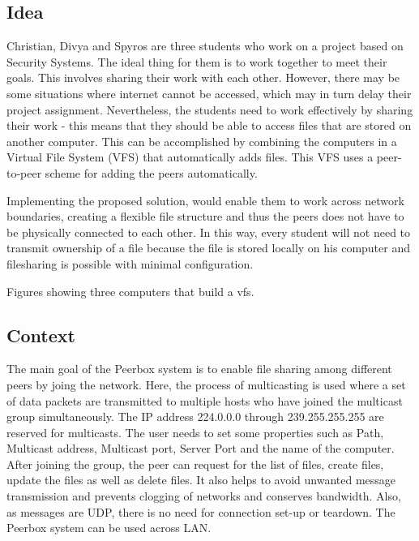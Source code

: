 
\subsection{Idea}

Christian, Divya and Spyros are three students who work on a project based on Security Systems. The ideal thing for them is to work together to meet their goals. This involves sharing their work with each other. However, there may be some situations where internet cannot be accessed, which may in turn delay their project assignment. Nevertheless, the students need to work effectively by sharing their work - this means that they should be able to access files that are stored on another computer. This can be accomplished by combining the computers in a Virtual File System (VFS) that automatically adds files. This VFS uses a peer-to-peer scheme for adding the peers automatically.

Implementing the proposed solution, would  enable them to work across network boundaries, creating a flexible file structure and thus the peers does not have to be physically connected to each other. In this way, every student will not need to transmit ownership of a file because the file is stored locally on his computer and filesharing is possible with minimal configuration. 



Figures showing three computers that build a vfs.


\subsection{Context}
The main goal of the Peerbox system is to enable file sharing among different peers by joing the network. Here, the process of multicasting is used where a set of data packets are transmitted to  multiple hosts who have joined the multicast group simultaneously. The IP address 224.0.0.0 through 239.255.255.255 are reserved for multicasts. The user needs to set some properties such as Path, Multicast address, Multicast port, Server Port and the name of the computer. After joining the group, the peer can request for the list of files, create files, update the files as well as delete files. It also helps to avoid unwanted message transmission and prevents clogging of networks and conserves bandwidth. Also, as messages are UDP, there is no need for connection set-up or teardown. The Peerbox system can be used across LAN.  


